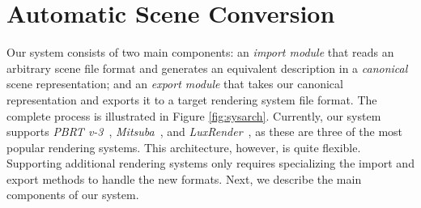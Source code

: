 \chapter{Automatic Scene Conversion} 
\label{sec:systemarch}

Our system consists of two main components: an {\it import module} that reads an arbitrary scene file format and generates an equivalent description in a {\it canonical} scene representation; and an {\it export module} that takes our canonical representation and exports it to a target rendering system file format. The complete process is illustrated in Figure \ref{fig:sysarch}. 
Currently, our system supports \textit{PBRT v-3}~\cite{PBRT:v3}, \textit{Mitsuba}~\cite{mitsuba}, and \textit{LuxRender}~\cite{luxrender}, as these are three of the most popular rendering systems.
This architecture, however, is quite flexible. Supporting additional rendering systems only requires specializing the import and export methods to handle the new formats. 
%
Next, we describe the main components of our system.





